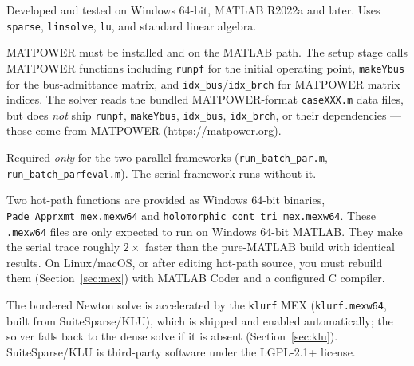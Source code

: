 \documentclass[11pt,a4paper]{article}
\newcommand{\code}[1]{\texttt{#1}}
\begin{document}
\begin{description}[leftmargin=0em,style=nextline]
\item[MATLAB (required).] Developed and tested on Windows 64-bit, MATLAB R2022a and
      later. Uses \code{sparse}, \code{linsolve}, \code{lu}, and standard linear algebra.
\item[MATPOWER (required).] MATPOWER must be installed and on the MATLAB path. The setup
      stage calls MATPOWER functions including \code{runpf} for the initial operating
      point, \code{makeYbus} for the bus-admittance matrix, and
      \code{idx_bus}/\code{idx_brch} for MATPOWER matrix indices. The solver reads the
      bundled MATPOWER-format \code{caseXXX.m} data files, but does \emph{not} ship
      \code{runpf}, \code{makeYbus}, \code{idx_bus}, \code{idx_brch}, or their
      dependencies --- those come from MATPOWER (\url{https://matpower.org}).
\item[Parallel Computing Toolbox (optional).] Required \emph{only} for the two parallel
      frameworks (\code{run_batch_par.m}, \code{run_batch_parfeval.m}). The serial
      framework runs without it.
\item[Compiled MEX (shipped).] Two hot-path functions are provided as Windows 64-bit
      binaries, \code{Pade_Apprxmt_mex.mexw64} and \code{holomorphic_cont_tri_mex.mexw64}.
      These \code{.mexw64} files are only expected to run on Windows 64-bit MATLAB. They
      make the serial trace roughly $2\times$ faster than the pure-MATLAB build with
      identical results. On Linux/macOS, or after editing hot-path source, you must
      rebuild them (Section~\ref{sec:mex}) with MATLAB Coder and a configured C compiler.
\item[KLU acceleration (shipped).] The bordered Newton solve is accelerated by the
      \code{klurf} MEX (\code{klurf.mexw64}, built from SuiteSparse/KLU), which is shipped and
      enabled automatically; the solver falls back to the dense solve if it is absent
      (Section~\ref{sec:klu}). SuiteSparse/KLU is third-party software under the LGPL-2.1+
      license.
\end{description}
\end{document}
